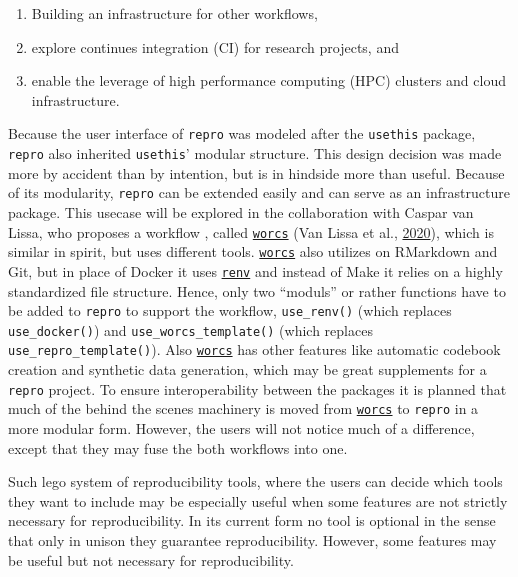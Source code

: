 \documentclass[12pt,a4paper,]{article}
\providecommand{\tightlist}{%
  \setlength{\itemsep}{0pt}\setlength{\parskip}{0pt}}
\begin{document}
\begin{enumerate}
\def\labelenumi{\arabic{enumi}.}
\tightlist
\item
  Building an infrastructure for other workflows,
\item
  explore continues integration (CI) for research projects, and
\item
  enable the leverage of high performance computing (HPC) clusters and cloud infrastructure.
\end{enumerate}

Because the user interface of \texttt{repro} was modeled after the \texttt{usethis} package, \texttt{repro} also inherited \texttt{usethis}' modular structure.
This design decision was made more by accident than by intention, but is in hindside more than useful.
Because of its modularity, \texttt{repro} can be extended easily and can serve as an infrastructure package.
This usecase will be explored in the collaboration with Caspar van Lissa, who proposes a workflow , called \href{https://cjvanlissa.github.io/worcs/}{\texttt{worcs}} (Van Lissa et al., \protect\hyperlink{ref-vanlissaWORCSWorkflowOpen2020}{2020}), which is similar in spirit, but uses different tools.
\href{https://cjvanlissa.github.io/worcs/}{\texttt{worcs}} also utilizes on RMarkdown and Git, but in place of Docker it uses \href{https://rstudio.github.io/renv/articles/renv.html}{\texttt{renv}} and instead of Make it relies on a highly standardized file structure.
Hence, only two ``moduls'' or rather functions have to be added to \texttt{repro} to support the workflow, \texttt{use\_renv()} (which replaces \texttt{use\_docker()}) and \texttt{use\_worcs\_template()} (which replaces \texttt{use\_repro\_template()}).
Also \href{https://cjvanlissa.github.io/worcs/}{\texttt{worcs}} has other features like automatic codebook creation and synthetic data generation, which may be great supplements for a \texttt{repro} project.
To ensure interoperability between the packages it is planned that much of the behind the scenes machinery is moved from \href{https://cjvanlissa.github.io/worcs/}{\texttt{worcs}} to \texttt{repro} in a more modular form.
However, the users will not notice much of a difference, except that they may fuse the both workflows into one.

Such lego system of reproducibility tools, where the users can decide which tools they want to include may be especially useful when some features are not strictly necessary for reproducibility.
In its current form no tool is optional in the sense that only in unison they guarantee reproducibility.
However, some features may be useful but not necessary for reproducibility.
\end{document}

